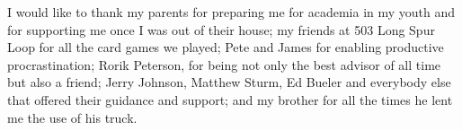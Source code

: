 I would like to thank my parents for preparing me for academia in my youth and
for supporting me once I was out of their house; my friends at 503 Long Spur
Loop for all the card games we played; Pete and James for enabling productive
procrastination; Rorik Peterson, for being not only the best advisor of all time
but also a friend; Jerry Johnson, Matthew Sturm, Ed Bueler and everybody else
that offered their guidance and support; and my brother for all the times he
lent me the use of his truck.
